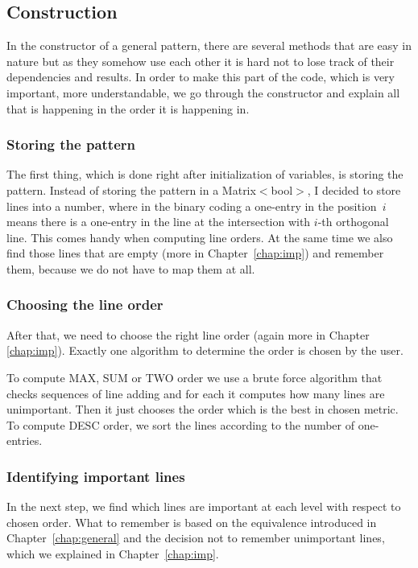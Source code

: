 \subsection{Construction}
In the constructor of a general pattern, there are several methods that are easy in nature but as they somehow use each other it is hard not to lose track of their dependencies and results. In order to make this part of the code, which is very important, more understandable, we go through the constructor and explain all that is happening in the order it is happening in.

\subsubsection{Storing the pattern}
The first thing, which is done right after initialization of variables, is storing the pattern. Instead of storing the pattern in a Matrix$<$bool$>$, I decided to store lines into a number, where in the binary coding a one-entry in the position~$i$ means there is a one-entry in the line at the intersection with $i$-th orthogonal line. This comes handy when computing line orders. At the same time we also find those lines that are empty (more in Chapter~\ref{chap:imp}) and remember them, because we do not have to map them at all.

\subsubsection{Choosing the line order}
After that, we need to choose the right line order (again more in Chapter \ref{chap:imp}). Exactly one algorithm to determine the order is chosen by the user.

To compute MAX, SUM or TWO order we use a brute force algorithm that checks sequences of line adding and for each it computes how many lines are unimportant. Then it just chooses the order which is the best in chosen metric. To compute DESC order, we sort the lines according to the number of one-entries.

\subsubsection{Identifying important lines}
In the next step, we find which lines are important at each level with respect to chosen order. What to remember is based on the equivalence introduced in Chapter~\ref{chap:general} and the decision not to remember unimportant lines, which we explained in Chapter~\ref{chap:imp}.

